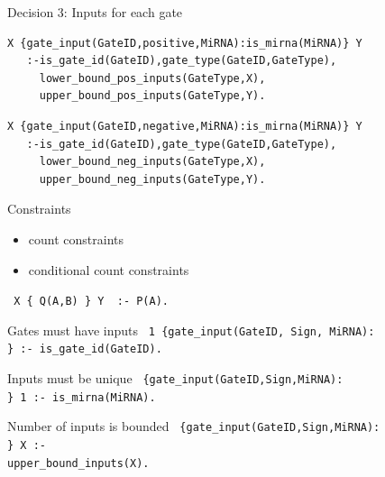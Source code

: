 \documentclass[10pt,dvipsnames]{beamer}
\begin{document}
\begin{frame}[fragile]{Decision 3: Inputs for each gate}
\small
{\color{blue}{\large positive inputs:}}
\begin{verbatim}
X {gate_input(GateID,positive,MiRNA):is_mirna(MiRNA)} Y 
   :-is_gate_id(GateID),gate_type(GateID,GateType),
     lower_bound_pos_inputs(GateType,X), 
     upper_bound_pos_inputs(GateType,Y).
\end{verbatim}

{\color{blue}{\large negative inputs:}}
\begin{verbatim}
X {gate_input(GateID,negative,MiRNA):is_mirna(MiRNA)} Y 
   :-is_gate_id(GateID),gate_type(GateID,GateType),
     lower_bound_neg_inputs(GateType,X),
     upper_bound_neg_inputs(GateType,Y).
\end{verbatim}
\end{frame}



\begin{frame}[fragile]{Constraints}
 \begin{itemize}
  \item count constraints
  \item conditional count constraints
 \end{itemize}
 \vspace{1cm}
 \begin{center}
  \texttt{ X \{ Q(A,B) \} Y {\color{orange} :- P(A)}. }
 \end{center}


\end{frame}


\begin{frame}{Gates must have inputs}
 \texttt{
 1 \{gate\_input(GateID, Sign, MiRNA):\\
  \} :- is\_gate\_id(GateID).
 }
\end{frame}


\begin{frame}{Inputs must be unique}
 \texttt{
  \{gate\_input(GateID,Sign,MiRNA):\\
   \} 1 :- is\_mirna(MiRNA).
 }
\end{frame}


\begin{frame}{Number of inputs is bounded}
 \texttt{
  \{gate\_input(GateID,Sign,MiRNA):\\
   \} X :-\\
   \quad upper\_bound\_inputs(X).
 }
\end{frame}
\end{document}
